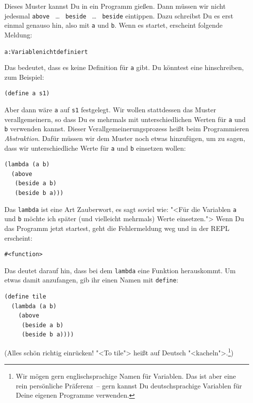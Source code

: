 Dieses Muster kannst Du in ein Programm gießen.  Dann müssen wir nicht
jedesmal \lstinline{above} ~\ldots~ \lstinline{beside} ~\ldots~ \lstinline{beside} eintippen.
Dazu schreibst Du es erst einmal genauso hin, also mit \lstinline{a} und
\lstinline{b}.  Wenn es startet, erscheint folgende Meldung:
%
\begin{alltt}
\color{red}a: Variable nicht definiert
\end{alltt}
%
Das bedeutet, dass es keine Definition für \lstinline{a} gibt.
Du könntest eine hinschreiben, zum Beispiel:
%
\begin{lstlisting}
(define a s1)
\end{lstlisting}
%
Aber dann wäre \lstinline{a} auf \lstinline{s1} festgelegt.  Wir wollen
stattdessen das Muster verallgemeinern, so dass Du es mehrmals mit
unterschiedlichen Werten für \lstinline{a} und \lstinline{b} verwenden
kannst.  Dieser Verallgemeinerungsprozess heißt beim Programmieren
\textit{Abstraktion}.  Dafür müssen wir dem Muster
noch etwas hinzufügen, um zu sagen, dass wir unterschiedliche Werte
für \lstinline{a} und \lstinline{b} einsetzen wollen:
%
\begin{lstlisting}
(lambda (a b)
  (above
   (beside a b)
   (beside b a)))
\end{lstlisting}
%
Das \lstinline{lambda} ist eine Art Zauberwort, es sagt soviel wie: "<Für
die Variablen \lstinline{a} und \lstinline{b} möchte ich später (und
vielleicht mehrmals) Werte einsetzen.">  Wenn Du das Programm jetzt
startest, geht die Fehlermeldung weg und in der REPL erscheint:
%
\begin{lstlisting}
#<function>
\end{lstlisting}
%
Das deutet darauf hin, dass bei dem \lstinline{lambda} eine Funktion
herauskommt.  Um etwas damit anzufangen, gib ihr einen Namen mit
\lstinline{define}:
%
\begin{lstlisting}
(define tile
  (lambda (a b)
    (above
     (beside a b)
     (beside b a))))
\end{lstlisting}
%
(Alles schön richtig einrücken! "<To tile"> heißt auf Deutsch
"<kacheln">.\footnote{Wir mögen gern englischsprachige Namen für
  Variablen.  Das ist aber eine rein persönliche Präferenz~-- gern
  kannst Du deutschsprachige Variablen für Deine eigenen Programme
  verwenden.})

